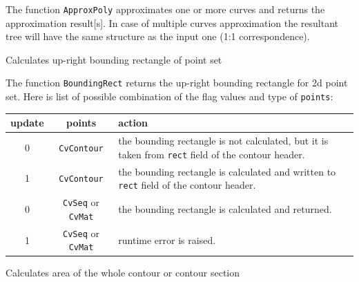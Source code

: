 The function \texttt{ApproxPoly} approximates one or more curves and returns the approximation result[s]. In case of multiple curves approximation the resultant tree will have the same structure as the input one (1:1 correspondence).

\label{BoundingRect}

Calculates up-right bounding rectangle of point set


\begin{description}
\end{description}

The function \texttt{BoundingRect} returns the up-right bounding rectangle for 2d point set.
Here is list of possible combination of the flag values and type of \texttt{points}:

\begin{tabular}{|c|c|p{3in}|}
\hline
update & points & action \\ \hline
0 & \texttt{CvContour\*} & the bounding rectangle is not calculated, but it is taken from \texttt{rect} field of the contour header.\\ \hline
1 & \texttt{CvContour\*} & the bounding rectangle is calculated and written to \texttt{rect} field of the contour header.\\ \hline
0 & \texttt{CvSeq\*} or \texttt{CvMat\*} & the bounding rectangle is calculated and returned.\\ \hline
1 & \texttt{CvSeq\*} or \texttt{CvMat\*} & runtime error is raised.\\ \hline
\end{tabular}

\label{ContourArea}

Calculates area of the whole contour or contour section


\begin{description}
\end{description}

